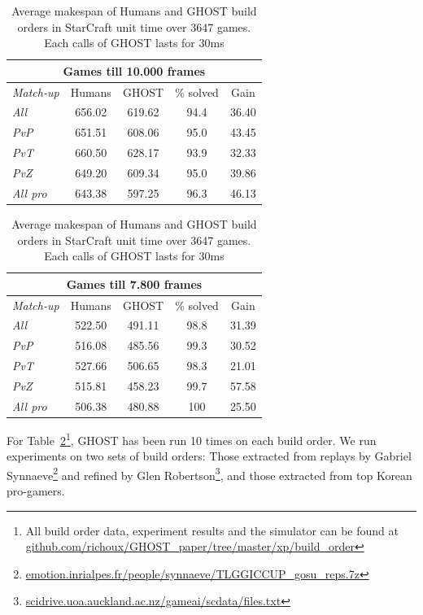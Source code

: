 \documentclass{article}
\newcommand{\ghost}{\textsc{GHOST}\xspace}
\begin{document}
\begin{table}[ht]
  \caption{Average  makespan  of Humans  and  \ghost  build orders  in
    StarCraft unit time over 3647 games. Each calls  of \ghost
    lasts for 30ms}
  \label{tab:bo}
  \centering
  \begin{tabular}{|l|c|c|c|c|} 
    \hline
    \multicolumn{5}{|c|}{Games till 10.000 frames} \\ 
    \hline
    {\em Match-up} & Humans & \ghost & \% solved &
    Gain \\ 
    \hline
    {\em All} & 656.02 & 619.62 & 94.4 & 36.40\\
    {\em PvP} & 651.51 & 608.06 & 95.0 & 43.45\\
    {\em PvT} & 660.50 & 628.17 & 93.9 & 32.33\\
    {\em PvZ} & 649.20 & 609.34 & 95.0 & 39.86\\
    \hline
    \hline
    {\em All pro} & 643.38 & 597.25 & 96.3 & 46.13\\
    \hline
  \end{tabular}
  \begin{tabular}{|l|c|c|c|c|} 
    \hline
    \multicolumn{5}{|c|}{Games till 7.800 frames} \\ 
    \hline
    {\em Match-up} & Humans & \ghost & \% solved &
    Gain \\ 
    \hline
    {\em All} & 522.50 & 491.11 & 98.8 & 31.39\\
    {\em PvP} & 516.08 & 485.56 & 99.3 & 30.52\\
    {\em PvT} & 527.66 & 506.65 & 98.3 & 21.01\\
    {\em PvZ} & 515.81 & 458.23 & 99.7 & 57.58\\ 
    \hline
    \hline
    {\em All pro} & 506.38 & 480.88 & 100 & 25.50\\
    \hline
  \end{tabular}  
\end{table}

For  Table~\ref{tab:bo}\footnote{All  build   order  data,  experiment
  results     and     the     simulator    can     be     found     at
  \href{https://github.com/richoux/GHOST\_paper/tree/master/xp/build\_order}{github.com/richoux/GHOST\_paper/tree/master/xp/build\_order}},
\ghost has been  run 10 times on each build  order. We run experiments
on two sets  of build orders: Those extracted from  replays by Gabriel
Synnaeve\footnote{\href{http://emotion.inrialpes.fr/people/synnaeve/TLGGICCUP\_gosu\_reps.7z}{emotion.inrialpes.fr/people/synnaeve/TLGGICCUP\_gosu\_reps.7z}}
and                  refined                  by                  Glen
Robertson\footnote{\href{http://scidrive.uoa.auckland.ac.nz/gameai/scdata/files.txt}{scidrive.uoa.auckland.ac.nz/gameai/scdata/files.txt}},
and those extracted from top Korean pro-gamers.
\end{document}
